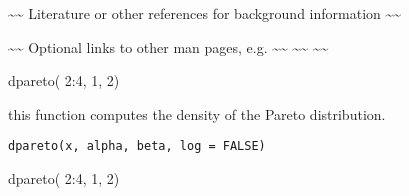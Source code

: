 \documentclass[a4paper]{book}
\begin{document}
%
\begin{References}\relax
\textasciitilde{}\textasciitilde{} Literature or other references for background information \textasciitilde{}\textasciitilde{}
\end{References}
%
\begin{SeeAlso}\relax
\textasciitilde{}\textasciitilde{} Optional links to other man pages, e.g. \textasciitilde{}\textasciitilde{}
\textasciitilde{}\textasciitilde{}  \textasciitilde{}\textasciitilde{}
\end{SeeAlso}
%
\begin{Examples}
\begin{ExampleCode}
dpareto( 2:4, 1, 2)
\end{ExampleCode}
\end{Examples}
%
\begin{Description}\relax
this function computes the density of the Pareto distribution.
\end{Description}
%
\begin{Usage}
\begin{verbatim}
dpareto(x, alpha, beta, log = FALSE)
\end{verbatim}
\end{Usage}
%
\begin{Arguments}
\begin{ldescription}
\item[\code{x}] 


\item[\code{alpha}] 


\item[\code{beta}] 


\item[\code{log}] 


\end{ldescription}
\end{Arguments}
%
\begin{Examples}
\begin{ExampleCode}
dpareto( 2:4, 1, 2)
\end{ExampleCode}
\end{Examples}
\printindex{}
\end{document}
